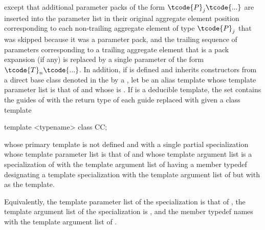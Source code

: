 except that additional parameter packs of the form $\tcode{P}_j \tcode{...}$
are inserted into the parameter list in their original aggregate element position corresponding to each non-trailing aggregate element of type $\tcode{P}_j$
that was skipped because it was a parameter pack, and
the trailing sequence of parameters corresponding
to a trailing aggregate element that is a pack expansion (if any)
is replaced by a single parameter of the form $\tcode{T}_n \tcode{...}$.
In addition,
if  is defined and
inherits constructors
from a direct base class denoted in the 
by a  ,
let  be an alias template
whose template parameter list is that of  and
whose  is .
If  is a deducible template,
the set contains the guides of 
with the return type  of each guide
replaced with  given a class template
\begin{codeblock}
template <typename> class CC;
\end{codeblock}
whose primary template is not defined and
with a single partial specialization
whose template parameter list is that of  and
whose template argument list is a specialization of  with
the template argument list of 
having a member typedef  designating a template specialization with
the template argument list of  but
with  as the template.
\begin{note}
Equivalently,
the template parameter list of the specialization is that of ,
the template argument list of the specialization is , and
the member typedef names  with the template argument list of .
\end{note}

